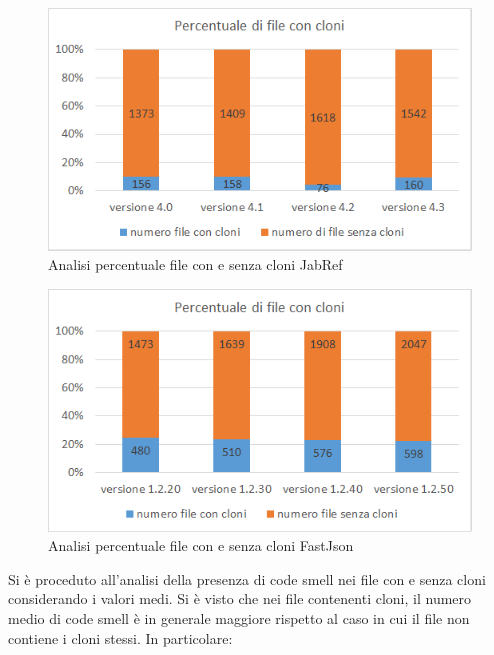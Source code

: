 \begin{figure}[h]
	\centering
	\includegraphics[scale=0.75, trim = 0cm 0cm 0cm 0cm, clip=true]{Grafici_jabRef/PercentualeFileCloni.png}
	\caption{Analisi percentuale file con e senza cloni JabRef}
	\label{fig:percentualeJabRef}
\end{figure}
\begin{figure}[h]
	\centering
	\includegraphics[scale=0.75, trim = 0cm 0cm 0cm 0cm, clip=true]{Grafici_fastJson/PercentualeFileCloni.png}
	\caption{Analisi percentuale file con e senza cloni FastJson}
	\label{fig:percentualeFastjson}
\end{figure}
Si è proceduto all'analisi della presenza di code smell nei file con e senza cloni considerando i valori medi. Si è visto che nei file contenenti cloni, il numero medio di code smell è in generale maggiore rispetto al caso in cui il file non contiene i cloni stessi. In particolare:
